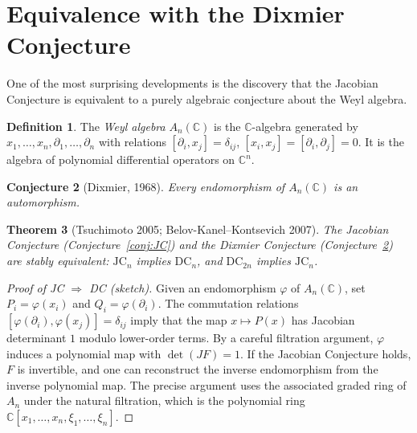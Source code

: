\documentclass[12pt,a4paper]{amsart}
\newtheorem{theorem}{Theorem}[section]
\newtheorem{conjecture}[theorem]{Conjecture}
\theoremstyle{definition}
\newtheorem{definition}[theorem]{Definition}
\theoremstyle{remark}
\begin{document}
\section{Equivalence with the Dixmier Conjecture}
\label{sec:dixmier}

One of the most surprising developments is the discovery that the Jacobian
Conjecture is equivalent to a purely algebraic conjecture about the Weyl algebra.

\begin{definition}
The \emph{Weyl algebra} $A_n(\mathbb{C})$ is the $\mathbb{C}$-algebra generated
by $x_1,\ldots,x_n, \partial_1, \ldots, \partial_n$ with relations
$[\partial_i, x_j] = \delta_{ij}$, $[x_i, x_j] = [\partial_i, \partial_j] = 0$.
It is the algebra of polynomial differential operators on $\mathbb{C}^n$.
\end{definition}

\begin{conjecture}[Dixmier, 1968]\label{conj:dixmier}
Every endomorphism of $A_n(\mathbb{C})$ is an automorphism.
\end{conjecture}

\begin{theorem}[Tsuchimoto 2005; Belov-Kanel--Kontsevich 2007]\label{thm:JC=DC}
The Jacobian Conjecture (Conjecture~\ref{conj:JC}) and the Dixmier Conjecture
(Conjecture~\ref{conj:dixmier}) are stably equivalent: $\mathrm{JC}_n$ implies
$\mathrm{DC}_n$, and $\mathrm{DC}_{2n}$ implies $\mathrm{JC}_n$.
\end{theorem}

\begin{proof}[Proof of JC $\Rightarrow$ DC (sketch)]
Given an endomorphism $\varphi$ of $A_n(\mathbb{C})$, set $P_i = \varphi(x_i)$
and $Q_i = \varphi(\partial_i)$. The commutation relations $[\varphi(\partial_i), \varphi(x_j)] = \delta_{ij}$
imply that the map $x \mapsto P(x)$ has Jacobian determinant $1$ modulo lower-order
terms. By a careful filtration argument, $\varphi$ induces a polynomial map
with $\det(JF) = 1$. If the Jacobian Conjecture holds, $F$ is invertible, and
one can reconstruct the inverse endomorphism from the inverse polynomial map.
The precise argument uses the associated graded ring of $A_n$ under the natural
filtration, which is the polynomial ring $\mathbb{C}[x_1,\ldots,x_n, \xi_1,\ldots,\xi_n]$.
\end{proof}
\end{document}
